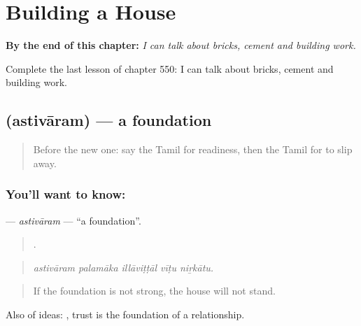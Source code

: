 
\chapter{Building a House}
\label{ch:ta-building-a-house}

\begin{chapteropening}
\textbf{By the end of this chapter:} \emph{I can talk about bricks, cement and building work.}

Complete the last lesson of chapter 550: I can talk about bricks, cement and building work.
\end{chapteropening}

\section[\texorpdfstring{\ta{அஸ்திவாரம்} (astivāram)}{அஸ்திவாரம் (astivāram)}]{ (astivāram) — a foundation}

\label{lesson:TA-C550-astivaram}



\begin{quote}
Before the new one: say the Tamil for readiness, then the Tamil for to slip away.
\end{quote}

\subsection*{You'll want to know: }
\textbf{} — \emph{astivāram} — \textquotedblleft{}a foundation\textquotedblright{}.

\begin{quote}
    .
\end{quote}

\begin{quote}
\emph{astivāram palamāka illāviṭṭāl vīṭu niṟkātu.}
\end{quote}

\begin{quote}
If the foundation is not strong, the house will not stand.
\end{quote}

Also of ideas:   , trust is the foundation of a relationship.

